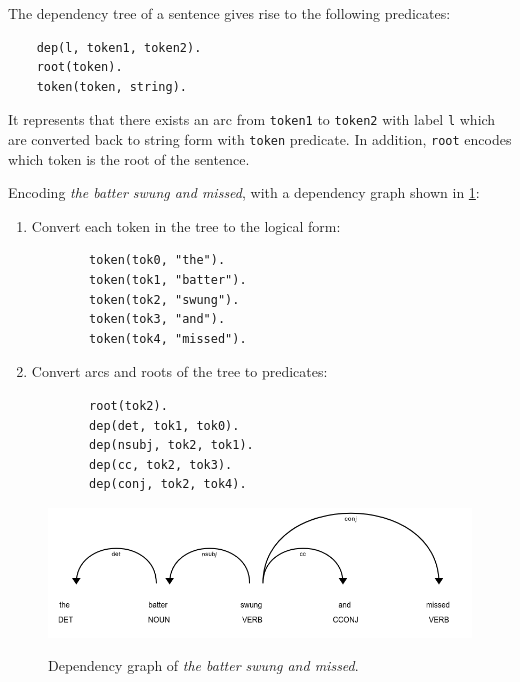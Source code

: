 The dependency tree of a sentence gives rise to the following predicates:
\begin{verbatim}
    dep(l, token1, token2).
    root(token).
    token(token, string).
\end{verbatim}

It represents that there exists an arc from \verb_token1_ to \verb_token2_ with label \verb+l+ which are converted back to string form with \verb_token_ predicate.
In addition, \verb_root_ encodes which token is the root of the sentence.

\begin{example}
\label{logical-encoding-example}
Encoding \textit{the batter swung and missed}, with a dependency graph shown in \ref{example-dependency-graph}:
\begin{enumerate}
    \item Convert each token in the tree to the logical form:
    \begin{verbatim}
        token(tok0, "the").
        token(tok1, "batter").
        token(tok2, "swung").
        token(tok3, "and").
        token(tok4, "missed").
    \end{verbatim}
    \item Convert arcs and roots of the tree to predicates:
    \begin{verbatim}
        root(tok2).
        dep(det, tok1, tok0).
        dep(nsubj, tok2, tok1).
        dep(cc, tok2, tok3).
        dep(conj, tok2, tok4).
    \end{verbatim}
\end{enumerate}
\end{example} 

\begin{figure}[h]
\caption{Dependency graph of \emph{the batter swung and missed}.}
\vspace{10pt}
\centering
\includegraphics[width=\textwidth]{solving-nlp-tasks-logically/example_dependency_tree.png}
\label{example-dependency-graph}
\end{figure}


